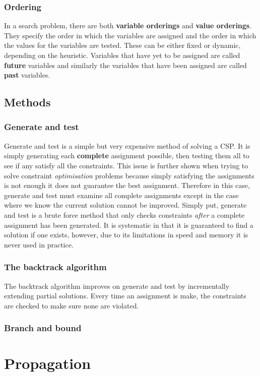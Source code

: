 \documentclass[CS4402-Notes.tex]{subfiles}
\begin{document}
\subsubsection{Ordering}
In a search problem, there are both \textbf{variable orderings} and \textbf{value orderings}. They specify the order in which the variables are assigned and the order in which the values for the variables are tested. These can be either fixed or dynamic, depending on the heuristic. 
\n
Variables that have yet to be assigned are called \textbf{future} variables and similarly the variables that have been assigned are called \textbf{past} variables. 

\subsection{Methods}
\subsubsection{Generate and test}
Generate and test is a simple but very expensive method of solving a CSP. It is simply generating each \textbf{complete} assignment possible, then testing them all to see if any satisfy all the constraints. 
\n
This issue is further shown when trying to solve constraint \textit{optimisation} problems because simply satisfying the assignments is not enough it does not guarantee the best assignment. Therefore in this case, generate and test must examine all complete assignments except in the case where we know the current solution cannot be improved. 
\n
Simply put, generate and test is a brute force method that only checks constraints \textit{after} a complete assignment has been generated. It is systematic in that it is guaranteed to find a solution if one exists, however, due to its limitations in speed and memory it is never used in practice. 

\subsubsection{The backtrack algorithm}
The backtrack algorithm improves on generate and test by incrementally extending partial solutions. Every time an assignment is make, the constraints are checked to make sure none are violated. 
\subsubsection{Branch and bound}

\section{Propagation}
\end{document}
